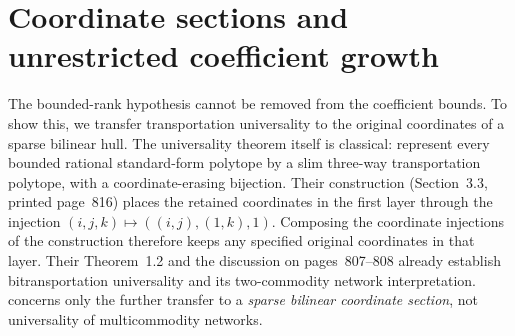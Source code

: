 \section{Coordinate sections and unrestricted coefficient growth}\label{sec:universality}

The bounded-rank hypothesis cannot be removed from the coefficient bounds.
To show this, we transfer transportation universality to the original
coordinates of a sparse bilinear hull. The universality theorem itself is
classical: \citet[Theorem~1.1]{DeLoeraOnn2006} represent every bounded
rational standard-form polytope by a slim three-way transportation
polytope, with a coordinate-erasing bijection. Their construction
(Section~3.3, printed page~816) places the retained coordinates in the
first layer through the injection $(i,j,k)\mapsto((i,j),(1,k),1)$.
Composing the coordinate injections of the construction therefore keeps
any specified original coordinates in that layer. Their Theorem~1.2 and
the discussion on pages~807--808 already establish bitransportation
universality and its two-commodity network interpretation.
 concerns only the further transfer to a
\emph{sparse bilinear coordinate section}, not universality of
multicommodity networks.

